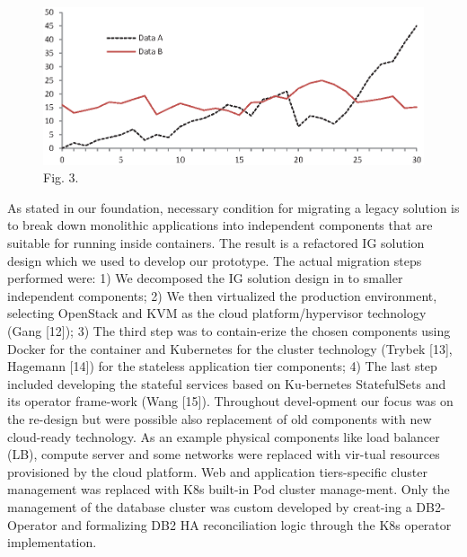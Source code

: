 \documentclass[runningheads]{llncs}
\begin{document}
\begin{figure}
\includegraphics[width=\textwidth]{fig1.eps}
\caption{Fig. 3.} \label{fig3}
\end{figure}

As stated in our foundation, necessary condition for migrating a legacy solution is to break down monolithic applications into independent components that are suitable for running inside containers. The result is a refactored IG solution design which we used to develop our prototype. The actual migration steps performed were: 1) We decomposed the IG solution design in to smaller independent components; 2) We then virtualized the production environment, selecting OpenStack and KVM as the cloud platform/hypervisor technology (Gang [12]); 3) The third step was to contain-erize the chosen components using Docker for the container and Kubernetes for the cluster technology (Trybek [13], Hagemann [14]) for the stateless application tier components; 4) The last step included developing the stateful services based on Ku-bernetes StatefulSets and its operator frame-work (Wang [15]). Throughout devel-opment our focus was on the re-design but were possible also replacement of old components with new cloud-ready technology. As an example physical components like load balancer (LB), compute server and some networks were replaced with vir-tual resources provisioned by the cloud platform. Web  and application  tiers-specific cluster management was replaced with K8s built-in Pod cluster manage-ment. Only the management of the database cluster was custom developed by creat-ing a DB2-Operator and formalizing DB2 HA reconciliation logic through the K8s operator implementation.
\end{document}
